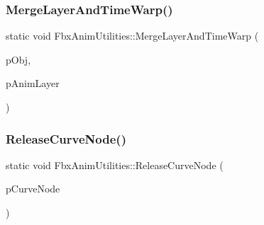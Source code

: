 \subsubsection{\texorpdfstring{Merge\+Layer\+And\+Time\+Warp()}{MergeLayerAndTimeWarp()}}
{\footnotesize\ttfamily static void Fbx\+Anim\+Utilities\+::\+Merge\+Layer\+And\+Time\+Warp (\begin{DoxyParamCaption}\item[{\hyperlink{class_fbx_object}{Fbx\+Object} $\ast$}]{p\+Obj,  }\item[{\hyperlink{class_fbx_anim_layer}{Fbx\+Anim\+Layer} $\ast$}]{p\+Anim\+Layer }\end{DoxyParamCaption})\hspace{0.3cm}{\ttfamily [static]}}

\mbox{\label{class_fbx_anim_utilities_a751c0a37e67e7642cd06226894c04f22}} 
\subsubsection{\texorpdfstring{Release\+Curve\+Node()}{ReleaseCurveNode()}}
{\footnotesize\ttfamily static void Fbx\+Anim\+Utilities\+::\+Release\+Curve\+Node (\begin{DoxyParamCaption}\item[{\hyperlink{class_fbx_anim_curve_node}{Fbx\+Anim\+Curve\+Node} $\ast$}]{p\+Curve\+Node }\end{DoxyParamCaption})\hspace{0.3cm}{\ttfamily [static]}}

\mbox{\label{class_fbx_anim_utilities_ad9fce04e63f88c748c00a9451b4b099b}} 
